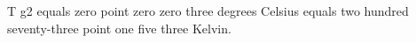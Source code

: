 T g2 equals zero point zero zero three degrees Celsius equals two hundred seventy-three point one five three Kelvin.